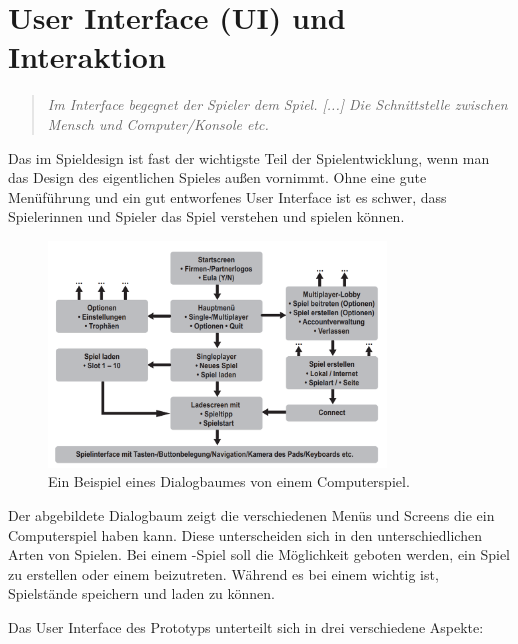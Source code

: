 
\chapter{User Interface (UI) und Interaktion}

\begin{quote}
\emph{\glqq Im Interface begegnet der Spieler dem Spiel. [...] Die Schnittstelle zwischen Mensch und Computer/Konsole etc.\grqq}~\cite[][Game Design und Produktion: Grundlagen, Anwendungen und Beispiele; p.~161]{GameDesign} 
\end{quote}

Das  im Spieldesign ist fast der wichtigste Teil der Spielentwicklung, wenn man das Design des eigentlichen Spieles außen vornimmt. Ohne eine gute Menüführung und ein gut entworfenes User Interface ist es schwer, dass Spielerinnen und Spieler das Spiel verstehen und spielen können. 

\begin{figure}[H]
  \centering
  \includegraphics[width=0.8\textwidth]{chapters/03/images/Spielinterface.png}
  \caption{Ein Beispiel eines Dialogbaumes von einem Computerspiel.}
  \label{htl01}
\end{figure}

Der abgebildete Dialogbaum zeigt die verschiedenen Menüs und Screens die ein Computerspiel haben kann. Diese unterscheiden sich in den unterschiedlichen Arten von Spielen. Bei einem -Spiel soll die Möglichkeit geboten werden, ein Spiel zu erstellen oder einem beizutreten. Während es bei einem  wichtig ist, Spielstände speichern und laden zu können.

\pagebreak

Das User Interface des Prototyps unterteilt sich in drei verschiedene Aspekte:

